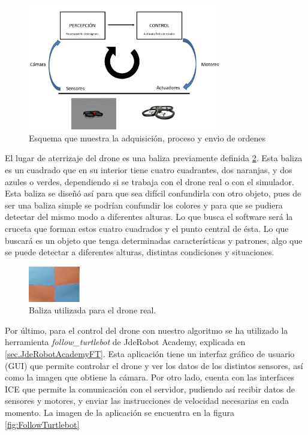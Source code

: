 \begin{figure}[H]
	\centering
		\includegraphics[width=0.75\textwidth]{imgs/esquema2.png}
         \caption{Esquema que muestra la adquisici\'on, proceso y envio de ordenes}
	\label{fig:esquema_d1}
\end{figure}

\hspace{1 cm} El lugar de aterrizaje del drone es una baliza previamente definida \ref{fig:esquema_d}. Esta baliza es un cuadrado que en su interior tiene cuatro cuadrantes, dos naranjas, y dos azules o verdes, dependiendo si se trabaja con el drone real o con el simulador. Esta baliza se diseñ\'o as\'i para que sea dif\'icil confundirla con otro objeto, pues de ser una baliza simple se podr\'ian confundir los colores y para que se pudiera detectar del mismo modo a diferentes alturas. Lo que busca el software ser\'a la cruceta que forman estos cuatro cuadrados y el punto central de \'esta. Lo que buscar\'a es un objeto que tenga determinadas caracter\'isticas y patrones, algo que se puede detectar a diferentes alturas, distintas condiciones y situaciones.

\begin{figure}[H]
	\centering
		\includegraphics[width=0.2\textwidth]{imgs/baliza.jpg}
         \caption{Baliza utilizada para el drone real.}
	\label{fig:esquema_d}
\end{figure}


\hspace{1 cm} Por \'ultimo, para el control del drone con nuestro algoritmo se ha utilizado la herramienta \textit{follow\_turtlebot} de JdeRobot Academy, explicada en \ref{sec.JdeRobotAcademyFT}. Esta aplicaci\'on tiene un interfaz gr\'afico de usuario (GUI) que permite controlar el drone y ver los datos de los distintos sensores, as\'i como la imagen que obtiene la c\'amara. Por otro lado, cuenta con las interfaces ICE que permite la comunicaci\'on con el servidor, pudiendo as\'i recibir datos de sensores y motores, y enviar las instrucciones de velocidad necesarias en cada momento. La imagen de la aplicaci\'on se encuentra en la figura \ref{fig:FollowTurtlebot}


